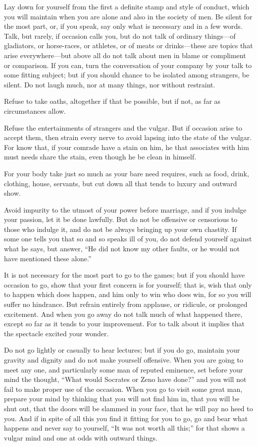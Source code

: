 Lay down  for yourself from  the first a definite  stamp and style  of conduct,
which you will maintain  when you are alone and also in the  society of men. Be
silent for the most part, or, if you speak, say only what is necessary and in a
few  words. Talk,  but  rarely, if  occasion  calls  you, but  do  not talk  of
ordinary things---of  gladiators, or horse-races,  or athletes, or of  meats or
drinks---these are  topics that  arise everywhere---but above  all do  not talk
about  men  in  blame  or  compliment  or comparison.  If  you  can,  turn  the
conversation of your company  by your talk to some fitting  subject; but if you
should chance to be isolated among strangers, be silent. Do not laugh much, nor
at many things, nor without restraint.

Refuse to  take oaths, altogether if  that be possible,  but if not, as  far as
circumstances allow.

Refuse the entertainments of strangers and the vulgar. But if occasion arise to
accept them,  then strain every  nerve to avoid lapsing  into the state  of the
vulgar. For know that, if your comrade  have a stain on him, he that associates
with him must needs share the stain, even though he be clean in himself.

For your  body take  just so  much as your  bare need  requires, such  as food,
drink, clothing,  house, servants, but  cut down all  that tends to  luxury and
outward show.

Avoid impurity to the utmost of your  power before marriage, and if you indulge
your passion, let it be done lawfully. But do not be offensive or censorious to
those who indulge  it, and do not  be always bringing up your  own chastity. If
some one  tells you that so  and so speaks ill  of you, do not  defend yourself
against what  he says, but  answer, ``He  did not know  my other faults,  or he
would not have mentioned these alone.''

It is  not necessary for the  most part to go  to the games; but  if you should
have occasion  to go, show  that your first concern  is for yourself;  that is,
wish that only to  happen which does happen, and him only to  win who does win,
for so  you will suffer  no hindrance. But  refrain entirely from  applause, or
ridicule, or  prolonged excitement. And  when you go away  do not talk  much of
what happened there, except so far as it tends to your improvement. For to talk
about it implies that the spectacle excited your wonder.

Do not go lightly or casually to hear lectures; but if you do go, maintain your
gravity and dignity and  do not make yourself offensive. When  you are going to
meet any  one, and particularly some  man of reputed eminence,  set before your
mind the thought, ``What  would Socrates or Zeno have done?''  and you will not
fail to make proper  use of the occasion. When you go to  visit some great man,
prepare your mind by  thinking that you will not find him in,  that you will be
shut out, that the doors will be slammed in your face, that he will pay no heed
to you. And if in  spite of all this you find it fitting for  you to go, go and
bear what happens and never say to yourself, ``It was not worth all this;'' for
that shows a vulgar mind and one at odds with outward things.


